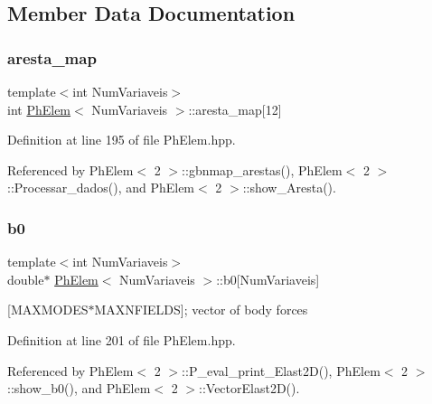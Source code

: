 \subsection{Member Data Documentation}
\mbox{\label{classPhElem_a27a4f856d62b68758e4c03c09b4c37f8}} 
\subsubsection{\texorpdfstring{aresta\+\_\+map}{aresta\_map}}
{\footnotesize\ttfamily template$<$int Num\+Variaveis$>$ \\
int \hyperlink{classPhElem}{Ph\+Elem}$<$ Num\+Variaveis $>$\+::aresta\+\_\+map\mbox{[}12\mbox{]}\hspace{0.3cm}{\ttfamily [protected]}}



Definition at line 195 of file Ph\+Elem.\+hpp.



Referenced by Ph\+Elem$<$ 2 $>$\+::gbnmap\+\_\+arestas(), Ph\+Elem$<$ 2 $>$\+::\+Processar\+\_\+dados(), and Ph\+Elem$<$ 2 $>$\+::show\+\_\+\+Aresta().

\mbox{\label{classPhElem_aeaebffae27dd713bbc06ad07b7b727a3}} 
\subsubsection{\texorpdfstring{b0}{b0}}
{\footnotesize\ttfamily template$<$int Num\+Variaveis$>$ \\
double$\ast$ \hyperlink{classPhElem}{Ph\+Elem}$<$ Num\+Variaveis $>$\+::b0\mbox{[}Num\+Variaveis\mbox{]}\hspace{0.3cm}{\ttfamily [protected]}}



\mbox{[}M\+A\+X\+M\+O\+D\+E\+S$\ast$\+M\+A\+X\+N\+F\+I\+E\+L\+DS\mbox{]}; vector of body forces 



Definition at line 201 of file Ph\+Elem.\+hpp.



Referenced by Ph\+Elem$<$ 2 $>$\+::\+P\+\_\+eval\+\_\+print\+\_\+\+Elast2\+D(), Ph\+Elem$<$ 2 $>$\+::show\+\_\+b0(), and Ph\+Elem$<$ 2 $>$\+::\+Vector\+Elast2\+D().

